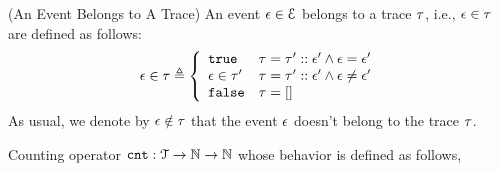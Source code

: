 \begin{defn}(An Event Belongs to A Trace)
  An event $\mathtt{\epsilon} \in \mathcal{E}$ belongs to a trace $\mathtt{\tau}$, i.e., $\mathtt{\epsilon} \in \mathtt{\tau}$ are defined as follows:
%
\begin{equation}
  \event \in \trace  
  \triangleq \left\{
  \begin{array}{ll} 
    \etrue                  & \trace =  \trace' :: \event'
     \land \event = \event'
                              \\
    \event \in \trace' & \trace =  \trace' :: \event'
    \land \event \neq \event' \\ 
    \efalse                 & \trace = []
  \end{array}
  \right.
\end{equation}
As usual, we denote by $\mathtt{\epsilon} \notin \mathtt{\tau}$ that the event $\mathtt{\epsilon}$ doesn't belong to the trace $\mathtt{\tau}$.
\end{defn}
%
Counting operator $\mathtt{cnt} : \mathcal{T} \to \mathbb{N} \to \mathbb{N}$ whose behavior is defined as follows,
